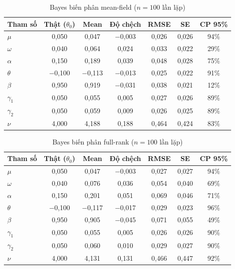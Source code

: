 \documentclass[11pt,a4paper]{article}
\begin{document}
\begin{table}[H]\centering\scriptsize
\caption{Bayes biến phân mean-field ($n=100$ lần lặp)}
\begin{tabularx}{\textwidth}{l C C C C C C}
\toprule
\textbf{Tham số} & \textbf{Thật ($\theta_0$)} & \textbf{Mean} & \textbf{Độ chệch} & \textbf{RMSE} & \textbf{SE} & \textbf{CP 95\%} \\
\midrule
$\mu$ & 0,050 & 0,047 & $-$0,003 & 0,026 & 0,026 & 94\% \\
$\omega$ & 0,040 & 0,064 & 0,024 & 0,033 & 0,022 & 29\% \\
$\alpha$ & 0,150 & 0,189 & 0,039 & 0,048 & 0,028 & 75\% \\
$\theta$ & $-$0,100 & $-$0,113 & $-$0,013 & 0,025 & 0,022 & 91\% \\
$\beta$ & 0,950 & 0,919 & $-$0,031 & 0,038 & 0,021 & 12\% \\
$\gamma_1$ & 0,050 & 0,055 & 0,005 & 0,027 & 0,026 & 89\% \\
$\gamma_2$ & 0,050 & 0,059 & 0,009 & 0,026 & 0,025 & 89\% \\
$\nu$ & 4,000 & 4,188 & 0,188 & 0,464 & 0,424 & 83\% \\
\bottomrule
\end{tabularx}
\end{table}

\begin{table}[H]\centering\scriptsize
\caption{Bayes biến phân full-rank ($n=100$ lần lặp)}
\begin{tabularx}{\textwidth}{l C C C C C C}
\toprule
\textbf{Tham số} & \textbf{Thật ($\theta_0$)} & \textbf{Mean} & \textbf{Độ chệch} & \textbf{RMSE} & \textbf{SE} & \textbf{CP 95\%} \\
\midrule
$\mu$ & 0,050 & 0,047 & $-$0,003 & 0,027 & 0,027 & 94\% \\
$\omega$ & 0,040 & 0,076 & 0,036 & 0,054 & 0,040 & 69\% \\
$\alpha$ & 0,150 & 0,201 & 0,051 & 0,069 & 0,046 & 71\% \\
$\theta$ & $-$0,100 & $-$0,117 & $-$0,017 & 0,029 & 0,023 & 96\% \\
$\beta$ & 0,950 & 0,905 & $-$0,045 & 0,071 & 0,055 & 49\% \\
$\gamma_1$ & 0,050 & 0,055 & 0,005 & 0,026 & 0,026 & 90\% \\
$\gamma_2$ & 0,050 & 0,060 & 0,010 & 0,029 & 0,027 & 90\% \\
$\nu$ & 4,000 & 4,131 & 0,131 & 0,466 & 0,447 & 92\% \\
\bottomrule
\end{tabularx}
\end{table}
\end{document}
